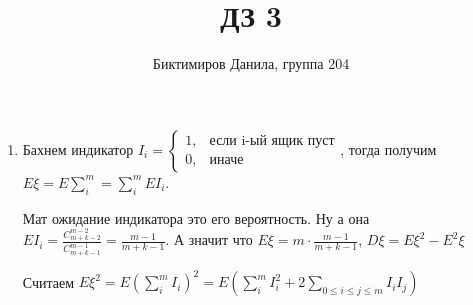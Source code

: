 \documentclass[11pt]{article}
\begin{document}
	
	\author{Биктимиров Данила, группа 204}
	\title{ДЗ 3}
	\date{}
	\maketitle
	
	\medskip
	
	\begin{enumerate}
		
		\item Бахнем индикатор $I_i=\begin{cases}
			1, &\text{если i-ый ящик пуст}\\
			0, &\text{иначе}
		\end{cases}$, тогда получим $E\xi=E\sum_{i}^{m}=\sum_{i}^{m}EI_i$.
	
		Мат ожидание индикатора это его вероятность. Ну а она $EI_i=\frac{C^{m-2}_{m+k-2}}{C^{m-1}_{m+k-1}}=\frac{m-1}{m+k-1}$. А значит что $E\xi=m\cdot \frac{m-1}{m+k-1}$, $D\xi = E\xi^2-E^2\xi$
		
		Считаем $E\xi^2=E(\sum_{i}^{m}I_i)^2=E\left(\sum_{i}^{m}I^2_i + 2\sum_{0\le i\le j\le m}I_iI_j \right)$
		
	\end{enumerate}
\end{document}
